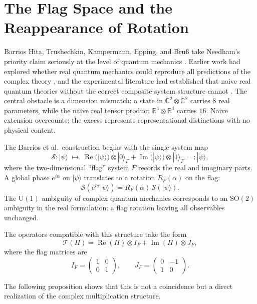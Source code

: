 \documentclass[12pt]{article}
\begin{document}
\section{The Flag Space and the Reappearance of Rotation}

Barrios Hita, Trushechkin, Kampermann, Epping, and Bru{\ss} take Needham's priority claim seriously at the level of quantum mechanics \cite{Barrios}. Earlier work had explored whether real quantum mechanics could reproduce all predictions of the complex theory \cite{Stueckelberg,Myrheim,McKague}, and the experimental literature had established that naive real quantum theories without the correct composite-system structure cannot \cite{Renou}. The central obstacle is a dimension mismatch: a state in $\mathbb{C}^2 \otimes \mathbb{C}^2$ carries $8$ real parameters, while the naive real tensor product $\mathbb{R}^4 \otimes \mathbb{R}^4$ carries $16$. Naive extension overcounts; the excess represents representational distinctions with no physical content.

The Barrios et al.\ construction begins with the single-system map
\[
\mathcal{S}\colon |\psi\rangle \;\mapsto\;
\operatorname{Re}(|\psi\rangle) \otimes |0\rangle_F
+ \operatorname{Im}(|\psi\rangle) \otimes |1\rangle_F
=: |\tilde{\psi}\rangle,
\]
where the two-dimensional ``flag'' system $F$ records the real and imaginary parts. A global phase $e^{i\alpha}$ on $|\psi\rangle$ translates to a rotation $R_F(\alpha)$ on the flag:
\[
\mathcal{S}(e^{i\alpha}|\psi\rangle) = R_F(\alpha)\,\mathcal{S}(|\psi\rangle).
\]
The $\mathrm{U}(1)$ ambiguity of complex quantum mechanics corresponds to an $\mathrm{SO}(2)$ ambiguity in the real formulation: a flag rotation leaving all observables unchanged.

The operators compatible with this structure take the form
\[
\mathcal{T}(\Pi) = \operatorname{Re}(\Pi) \otimes I_F + \operatorname{Im}(\Pi) \otimes J_F,
\]
where the flag matrices are
\[
I_F = \begin{pmatrix} 1 & 0 \\ 0 & 1 \end{pmatrix},
\qquad
J_F = \begin{pmatrix} 0 & -1 \\ 1 & 0 \end{pmatrix}.
\]

The following proposition shows that this is not a coincidence but a direct realization of the complex multiplication structure.
\end{document}
